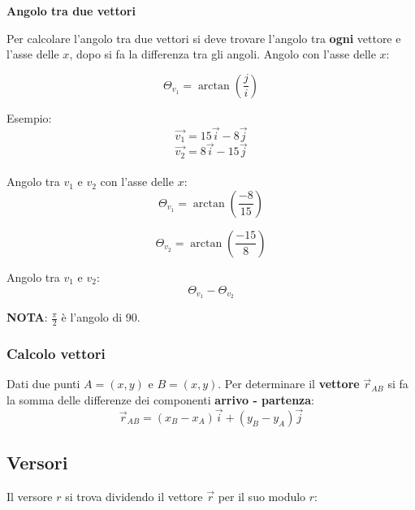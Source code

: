 \documentclass{article}
\begin{document}
\textbf{Angolo tra due vettori}

Per calcolare l'angolo tra due vettori si deve trovare l'angolo tra \textbf{ogni} vettore e l'asse delle $x$, dopo si fa la differenza tra gli angoli.
Angolo con l'asse delle $x$:

\begin{equation*}
  \Theta_{v_1}=\arctan(\frac{j}{i})
\end{equation*}

Esempio:
\begin{equation*}
  \overrightarrow{v_1} = 15\overrightarrow{i} - 8\overrightarrow{j}
\end{equation*}
\begin{equation*}
  \overrightarrow{v_2} = 8\overrightarrow{i} - 15\overrightarrow{j}
\end{equation*}\\
Angolo tra $v_1$ e $v_2$ con l'asse delle $x$:
\begin{equation*}
  \Theta_{v_1}=\arctan(\frac{-8}{15})
\end{equation*}

\begin{equation*}
  \Theta_{v_2}=\arctan(\frac{-15}{8})
\end{equation*}

Angolo tra $v_1$ e $v_2$: 
\begin{equation*}
  \Theta_{v_1}-\Theta_{v_2}
\end{equation*}

\textbf{NOTA}: $\frac{\pi}{2}$ è l'angolo di 90.

\subsubsection{Calcolo vettori}

Dati due punti $A=(x,y)$ e $B=(x,y)$. Per determinare il \textbf{vettore} $\overrightarrow{r}_{AB}$ si fa la somma delle differenze dei componenti \textbf{arrivo - partenza}:
\begin{equation*}
  \overrightarrow{r}_{AB} = (x_B-x_A)\overrightarrow{i} + (y_B-y_A)\overrightarrow{j}
\end{equation*}


\subsection*{Versori}

Il versore $r$ si trova dividendo il vettore $\overrightarrow{r}$ per il suo modulo $r$:
\end{document}
